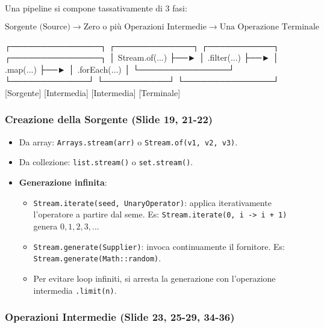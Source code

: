 \documentclass[11pt,a4paper,oneside]{report}
\newcommand{\passthrough}[1]{#1}
\providecommand{\tightlist}{\setlength{\itemsep}{0pt}\setlength{\parskip}{0pt}}
\begin{document}
Una pipeline si compone tassativamente di 3 fasi:

\[\text{Sorgente (Source)} \longrightarrow \text{Zero o più Operazioni Intermedie} \longrightarrow \text{Una Operazione Terminale}\]

\needspace{7cm}
\begin{asciibox}
┌───────────────┐     ┌─────────────┐     ┌───────────┐     ┌───────────────┐
│ Stream.of(...) ├──► │ .filter(...) ├──► │ .map(...) ├──►  │ .forEach(...) │
└───────────────┘     └─────────────┘     └───────────┘     └───────────────┘
   [Sorgente]          [Intermedia]        [Intermedia]        [Terminale]
\end{asciibox}

\subsubsection{Creazione della Sorgente (Slide 19,
21-22)}\label{chap17_creazione-della-sorgente-slide-19-21-22}

\begin{itemize}
\tightlist
\item
  Da array: \passthrough{\lstinline!Arrays.stream(arr)!} o
  \passthrough{\lstinline!Stream.of(v1, v2, v3)!}.
\item
  Da collezione: \passthrough{\lstinline!list.stream()!} o
  \passthrough{\lstinline!set.stream()!}.
\item
  \textbf{Generazione infinita}:

  \begin{itemize}
  \tightlist
  \item
    \passthrough{\lstinline!Stream.iterate(seed, UnaryOperator)!}:
    applica iterativamente l'operatore a partire dal seme. Es:
    \passthrough{\lstinline!Stream.iterate(0, i -> i + 1)!} genera
    \(0, 1, 2, 3, \dots\)
  \item
    \passthrough{\lstinline!Stream.generate(Supplier)!}: invoca
    continuamente il fornitore. Es:
    \passthrough{\lstinline!Stream.generate(Math::random)!}.
  \item
    Per evitare loop infiniti, si arresta la generazione con
    l'operazione intermedia \passthrough{\lstinline!.limit(n)!}.
  \end{itemize}
\end{itemize}

\subsubsection{Operazioni Intermedie (Slide 23, 25-29,
34-36)}\label{chap17_operazioni-intermedie-slide-23-25-29-34-36}
\end{document}
